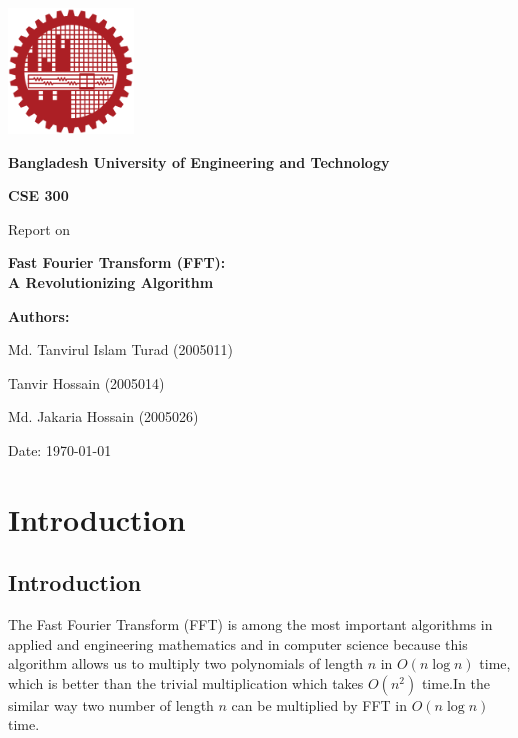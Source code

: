 \documentclass[28]{report}
\begin{document}
\begin{titlepage}
    \centering
    \vspace*{2cm}
    \includegraphics[width=0.25\textwidth]{images/buet.png}\\
    \vspace{1.5cm}
    {\Large \textbf{Bangladesh University of Engineering and Technology} \par}
    \vspace{2cm}
    {\LARGE \textbf{CSE 300} \par}
    \vspace{1cm}
    {\Large Report on \par}
    \vspace{0.5cm}
    {\LARGE \textbf{Fast Fourier Transform (FFT):\\[0.5em] A Revolutionizing Algorithm} \par}
    \vspace{1.5cm}
    {\large \textbf{Authors:} \par}
    \vspace{0.5cm}
    {\large Md. Tanvirul Islam Turad (2005011) \par}
    {\large Tanvir Hossain (2005014) \par}
    {\large Md. Jakaria Hossain (2005026)\par}
    \vspace{2cm}
    {\large Date: \today \par}
\end{titlepage}

\tableofcontents
\newpage

\chapter{Introduction}
\section{Introduction}
The Fast Fourier Transform (FFT) is among the most important algorithms
in applied and engineering mathematics and in computer science because this algorithm allows us to multiply two polynomials of length 
$n$ in 
$O(n \log n)$ time, which is better than the trivial multiplication which takes 
$O(n^2)$ time.In the similar way two number of length $n$ can be multiplied by FFT in $O(n \log n)$ time. \linebreak 
\end{document}
